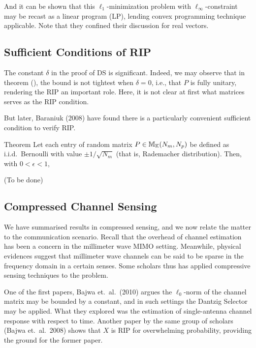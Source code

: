 And it can be shown that this \(\ell_1\)-minimization problem with \(\ell_\infty\)-constraint may be recast as a linear program (LP), lending convex programming technique applicable.
Note that they confined their discussion for real vectors.

\subsection{Sufficient Conditions of RIP}

The constant \(\delta\) in the proof of DS is significant.
Indeed, we may observe that in theorem (), the bound is not tightest when \(\delta=0\), i.e., that \(P\) is fully unitary, rendering the RIP an important role.
Here, it is not clear at first what matrices serves as the RIP condition.

But later, Baraniuk (2008) have found there is a particularly convenient sufficient condition to verify RIP.

\Result
{Theorem}
{
Let each entry of random matrix \(P \in \mathbb{M}_{\mathbb{K}} (N_m, N_p)\) be defined as i.i.d.\ Bernoulli with value \(\pm 1/\sqrt{N_m}\) (that is, Rademacher distribution).
Then, with \(0 <\epsilon <1\),
%
}

{ \color{red} (To be done) }

\subsection{Compressed Channel Sensing}

We have summarised results in compressed sensing, and we now relate the matter to the communication scenario.
Recall that the overhead of channel estimation has been a concern in the millimeter wave MIMO setting.
Meanwhile, physical evidences suggest that millimeter wave channels can be said to be sparse in the frequency domain in a certain senses.
Some scholars thus has applied compressive sensing techniques to the problem.

One of the first papers, Bajwa et.\ al.\ (2010) argues the \(\ell_0\)-norm of the channel matrix may be bounded by a constant, and in such settings the Dantzig Selector may be applied.
What they explored was the estimation of single-antenna channel response with respect to time.
Another paper by the same group of scholars (Bajwa et.\ al.\ 2008) shows that \(X\) is RIP for overwhelming probability, providing the ground for the former paper.

